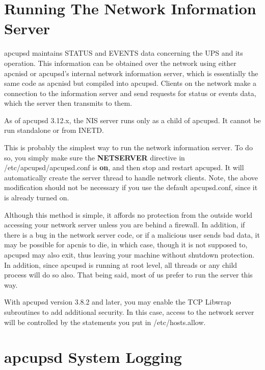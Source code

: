 {{{{{{{\label{Running-The-Network-Information-Server}

\section*{Running The Network Information Server}

apcupsd maintains STATUS and EVENTS data concerning the UPS and its operation.
This information can be obtained over the network using either apcnisd or
apcupsd's internal network information server, which is essentially the same
code as apcnisd but compiled into apcupsd. Clients on the network make a
connection to the information server and send requests for status or events
data, which the server then transmits to them.  

As of apcupsd 3.12.x, the NIS server runs only as a child of apcupsd.
It cannot be run standalone or from INETD.

This is probably the simplest way to run the network information server. To do
so, you simply make sure the {\bf NETSERVER} directive in
/etc/apcupsd/apcupsd.conf is {\bf on}, and then stop and restart apcupsd. It
will automatically create the server thread to handle network clients. 
Note, the above modification should not be necessary if you use the default
apcupsd.conf, since it is already turned on.  

Although this method is simple, it affords no protection from the outside
world accessing your network server unless you are behind a firewall. In
addition, if there is a bug in the network server code, or if a malicious user
sends bad data, it may be possible for apcnis to die, in which case, though it
is not supposed to, apcupsd may also exit, thus leaving your machine without
shutdown protection. In addition, since apcupsd is running at root level, all
threads or any child process will do so also. That being said, most of us
prefer to run the server this way.  

With apcupsd version 3.8.2 and later, you may enable the TCP Libwrap
subroutines to add additional security. In this case, access to the network
server will be controlled by the statements you put in /etc/hosts.allow. 

\label{apcupsd-System-Logging}

\section*{apcupsd System Logging}

}}}}}}}

